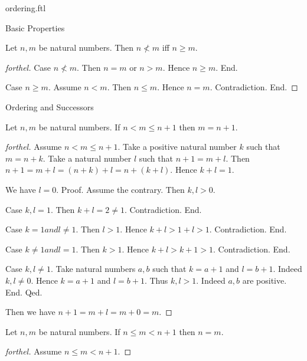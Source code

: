 \documentclass{naproche-library}
\begin{document}
\begin{smodule}[title=The Standard Ordering of the Natural Numbers]{ordering.ftl}
\begin{sfragment}{Basic Properties}
  \begin{proposition}[forthel,id=ARITHMETIC_04_6991525988794368]
    Let $n, m$ be natural numbers.
    Then $n \nless m$ iff $n \geq m$.
  \end{proposition}
  \begin{proof}[forthel]
    Case $n \nless m$.
      Then $n = m$ or $n > m$.
      Hence $n \geq m$.
    End.

    Case $n \geq m$.
      Assume $n < m$.
      Then $n \leq m$.
      Hence $n = m$.
      Contradiction.
    End.
  \end{proof}
\end{sfragment}

\begin{sfragment}{Ordering and Successors}
  \begin{proposition}[forthel,id=ARITHMETIC_04_7006203091615744]
    Let $n, m$ be natural numbers.
    If $n < m \leq n + 1$ then $m = n + 1$.
  \end{proposition}
  \begin{proof}[forthel]
    Assume $n < m \leq n + 1$.
    Take a positive natural number $k$ such that $m = n + k$.
    Take a natural number $l$ such that $n + 1 = m + l$.
    Then $n + 1
      = m + l
      = (n + k) + l
      = n + (k + l)$.
    Hence $k + l = 1$.

    We have $l = 0$. \newline
    Proof.
      Assume the contrary.
      Then $k,l > 0$.

      Case $k,l = 1$.
        Then $k + l
          = 2
          \neq 1$.
        Contradiction.
      End.

      Case $k = 1 and l \neq 1$.
        Then $l > 1$.
        Hence $k + l
          > 1 + l
          > 1$.
        Contradiction.
      End.

      Case $k \neq 1 and l = 1$.
        Then $k > 1$.
        Hence $k + l
          > k + 1
          > 1$.
        Contradiction.
      End.

      Case $k, l \neq 1$.
        Take natural numbers $a, b$ such that $k = a + 1$ and $l = b + 1$.
        Indeed $k, l \neq 0$.
        Hence $k = a + 1$ and $l = b + 1$.
        Thus $k, l > 1$. Indeed $a, b$ are positive.
      End.
    Qed.

    Then we have $n + 1
      = m + l
      = m + 0
      = m$.
  \end{proof}

  \begin{proposition}[forthel,id=ARITHMETIC_04_8792330561650688]
    Let $n, m$ be natural numbers.
    If $n \leq m < n + 1$ then $n = m$.
  \end{proposition}
  \begin{proof}[forthel]
    Assume $n \leq m < n + 1$.


\end{proof}
\end{sfragment}
\end{smodule}
\end{document}
